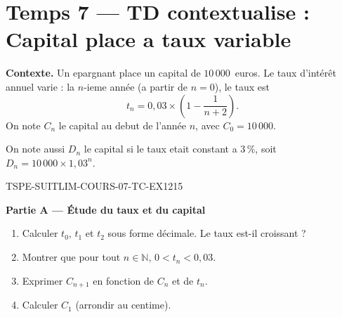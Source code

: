 
\section*{Temps 7 — TD contextualise : Capital place a taux variable}

\textbf{Contexte.} Un epargnant place un capital de $10\,000$~euros. Le taux d'intérêt annuel varie : la $n$-ieme année (a partir de $n = 0$), le taux est
\[
  t_n = 0{,}03 \times \left(1 - \frac{1}{n+2}\right).
\]
On note $C_n$ le capital au debut de l'année $n$, avec $C_0 = 10\,000$.

On note aussi $D_n$ le capital si le taux etait constant a $3\,\%$, soit $D_n = 10\,000 \times 1{,}03^n$.

\bigskip


\begin{exercice}{TSPE-SUITLIM-COURS-07-TC-EX1}{2}{15}

\textbf{Partie A — Étude du taux et du capital}

\begin{enumerate}
  \item Calculer $t_0$, $t_1$ et $t_2$ sous forme décimale. Le taux est-il croissant ?
  \item Montrer que pour tout $n \in \mathbb{N}$, $0 < t_n < 0{,}03$.
  \item Exprimer $C_{n+1}$ en fonction de $C_n$ et de $t_n$.
  \item Calculer $C_1$ (arrondir au centime).
\end{enumerate}

\end{exercice}

